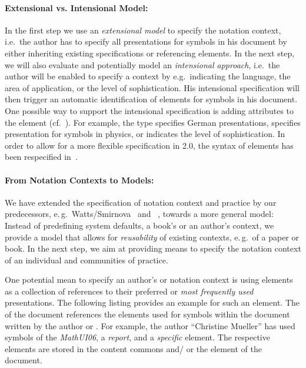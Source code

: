 \documentclass[a4paper]{article}
\begin{document}
\paragraph{Extensional vs. Intensional Model:} In the first step we use an
{\emph{extensional model}} to specify the notation context, i.e.\ the author has to
specify all presentations for symbols in his document by either inheriting existing
specifications or referencing {} elements. In the next step, we will
also evaluate and potentially model an {\emph{intensional approach}}, i.e.\ the author
will be enabled to specify a context by e.g.\ indicating the language, the area of
application, or the level of sophistication. His intensional specification will then
trigger an automatic identification of {} elements for symbols in
his document. One possible way to support the intensional specification is adding
{} attributes to the {} element
(cf.~\cite{ManLib:apo05}). For example, the type {}
specifies German presentations, {} specifies
presentation for symbols in physics, or {}
indicates the level of sophistication. In order to allow for a more flexible specification
in {\omdoc}2.0, the syntax of {} elements has been respecified
in~\cite{KohLanRab:pmcfe07}.


\paragraph{From Notation Contexts to {\cop} Models:} 
We have extended the specification of notation context and practice by our predecessors,
e.\,g.\ Watts/Smirnova~\cite{ESmStW:Notation} and {\activemath}~\cite{ManLib:apo05},
towards a more general model: Instead of predefining system defaults, a book's or an
author's context, we provide a model that allows for {\emph{reusability}} of existing
contexts, e.\,g.\ of a paper or book. In the next step, we aim at providing means to
specify the notation context of an individual and communities of practice.

One potential mean to specify an author's or {\cop} notation context is using
{} elements as a collection of references to their preferred or {\emph{most
    frequently used}} presentations. The following listing provides an example for such an
{} element. The {} of the document references the
{} elements used for symbols within the document written by the
author or {\cop}. For example, the author ``Christine Mueller'' has used symbols of the
\emph{MathUI06}, a \emph{report}, and a \emph{specific} {}
element. The respective {} elements are stored in the content
commons and/ or the {} element of the document.
\end{document}
